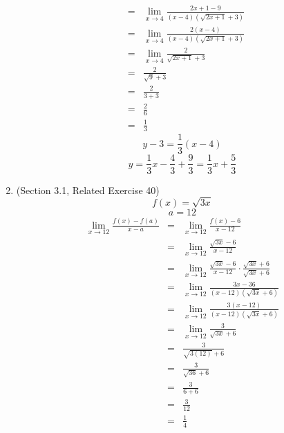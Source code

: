 \documentclass{article}
\begin{document}
\begin{enumerate}
\begin{eqnarray}
                                                &=& \lim_{x \to 4}{\frac{2x + 1 - 9}{(x - 4)(\sqrt{2x + 1} + 3)}} \\
                                                &=& \lim_{x \to 4}{\frac{2(x - 4)}{(x - 4)(\sqrt{2x + 1} + 3)}} \\
                                                &=& \lim_{x \to 4}{\frac{2}{\sqrt{2x + 1} + 3}} \\
                                                &=& \frac{2}{\sqrt{9} + 3} \\
                                                &=& \frac{2}{3 + 3} \\
                                                &=& \frac{2}{6} \\
                                                &=& \frac{1}{3}
    \end{eqnarray}
    $$y - 3 = \frac{1}{3}(x - 4)$$
    $$y = \frac{1}{3}x - \frac{4}{3} + \frac{9}{3} = \frac{1}{3}x + \frac{5}{3}$$
    \item (Section 3.1, Related Exercise 40)
    $$f(x) = \sqrt{3x}$$
    $$a = 12$$
    \begin{eqnarray}
        \lim_{x \to 12}{\frac{f(x) - f(a)}{x - a}} &=& \lim_{x \to 12}{\frac{f(x) - 6}{x - 12}} \\
                                                 &=& \lim_{x \to 12}{\frac{\sqrt{3x} - 6}{x - 12}} \\
                                                 &=& \lim_{x \to 12}{\frac{\sqrt{3x} - 6}{x - 12} \cdot \frac{\sqrt{3x} + 6}{\sqrt{3x} + 6}} \\
                                                 &=& \lim_{x \to 12}{\frac{3x - 36}{(x - 12)(\sqrt{3x} + 6)}} \\
                                                 &=& \lim_{x \to 12}{\frac{3(x - 12)}{(x - 12)(\sqrt{3x} + 6)}} \\
                                                 &=& \lim_{x \to 12}{\frac{3}{\sqrt{3x} + 6}} \\
                                                 &=& \frac{3}{\sqrt{3(12)} + 6} \\
                                                 &=& \frac{3}{\sqrt{36} + 6} \\
                                                 &=& \frac{3}{6 + 6} \\
                                                 &=& \frac{3}{12} \\
                                                 &=& \frac{1}{4}

\end{eqnarray}
\end{enumerate}
\end{document}

